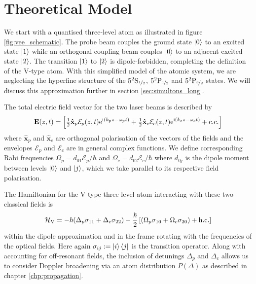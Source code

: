 \section{Theoretical Model}
  \label{sec:simultons_theory}

    We start with a quantised three-level atom as illustrated in figure
    \ref{fig:vee_schematic}. The probe beam couples the ground state $\Ket{0}$
    to an excited state $\Ket{1}$ while an orthogonal coupling beam couples
    $\Ket{0}$ to an adjacent excited state $\Ket{2}$. The transition $\Ket{1}$
    to $\Ket{2}$ is dipole-forbidden, completing the definition of the V-type
    atom. With this simplified model of the atomic system, we are neglecting the
    hyperfine structure of the $5^2\mathrm{S}_{\nicefrac{1}{2}}$,
    $5^2\mathrm{P}_{\nicefrac{1}{2}}$ and $5^2\mathrm{P}_{\nicefrac{3}{2}}$
    states. We will discuss this approximation further in section
    \ref{sec:simultons_long}.

    The total electric field vector for the two laser beams is described by
    \begin{equation}
      \mathbf{E}(z,t) = \left[ \tfrac{1}{2} \mathbf{\hat{x}}_p 
        \mathcal{E}_p(z,t) \mathrm{e}^{\mathrm{i}(k_p z - \omega_p t)} + 
        \tfrac{1}{2} \mathbf{\hat{x}}_c \mathcal{E}_c(z,t) \mathrm{e}^{\mathrm{i}(k_c z -
        \omega_c t)} + \mathrm{c.c.} \right]
      \label{eqn:env_carrier}
    \end{equation}
    where $\mathbf{\hat{x}}_p$ and $\mathbf{\hat{x}}_c$ are orthogonal
    polarisation of the vectors of the fields and the envelopes $\mathcal{E}_p$
    and $\mathcal{E}_c$ are in general complex functions. We define
    corresponding Rabi frequencies $\Omega_p = d_{01}\mathcal{E}_p/\hbar$ and
    $\Omega_c = d_{02}\mathcal{E}_c/\hbar$ where $d_{0j}$ is the dipole moment
    between levels $\Ket{0}$ and $\Ket{j}$, which we take parallel to its
    respective field polarisation.

    The Hamiltonian for the V-type three-level atom interacting with these two 
    classical fields is
    \begin{equation}
      \mathcal{H}_\mathrm{V} = -\hbar (\Delta_p \sigma_{11} + \Delta_c 
      \sigma_{22}) -\frac{\hbar}{2} 
      \left[ (\Omega_p \sigma_{10} + \Omega_c \sigma_{20} )
      + \mathrm{h.c.} \right]
      \label{eqn:vee_hamiltonian}
    \end{equation}
    within the dipole approximation and in the frame rotating with the
    frequencies of the optical fields. Here again $\sigma_{ij} := \Ket{i}\Bra{j}$ is
    the transition operator. Along with accounting for off-resonant fields, the
    inclusion of detunings $\Delta_p$ and $\Delta_c$ allows us to consider
    Doppler broadening via an atom distribution $P(\Delta)$ as described in
    chapter \ref{chp:propagation}.

